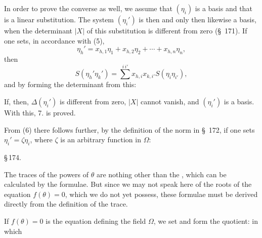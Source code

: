 In order to prove the converse as well, we assume that $(\eta_i)$ is a basis and that
is a linear substitution. The system $(\eta_i')$ is then and only then likewise a basis, when the determinant $|X|$ of this substitution is different from zero (\S\ 171). If one sets, in accordance with (5),
\[
\eta_h' = x_{h,1}\eta_1 + x_{h,2}\eta_2 + \cdots + x_{h,n}\eta_n,
\]
then
\[
S(\eta_h'\eta_k') = \sum^{i\,i'} x_{h,i} x_{k,i'} S(\eta_i \eta_{i'}),
\]
and by forming the determinant from this:

If, then, $\Delta(\eta_i')$ is different from zero, $|X|$ cannot vanish, and $(\eta_i')$ is a basis. With this, 7. is proved.

From (6) there follows further, by the definition of the norm in \S\ 172, if one sets $\eta_i' = \zeta\eta_i$, where $\zeta$ is an arbitrary function in $\Omega$:

\S\,174. 

The traces of the powers of $\theta$
are nothing other than the , which can be calculated by the  formulae. But since we may not speak here of the \glqq roots\grqq{} of the equation $f(\theta) = 0$, which we do not yet possess, these formulae must be derived directly from the definition of the trace.

If $f(\theta) = 0$ is the equation defining the field $\Omega$, we set
and form the quotient:
in which
